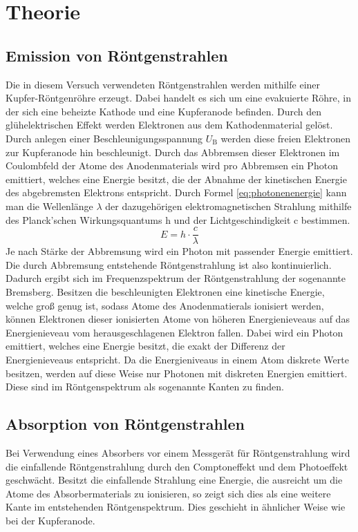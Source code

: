 
\section{Theorie}
%
\subsection{Emission von Röntgenstrahlen}
%
Die in diesem Versuch verwendeten Röntgenstrahlen werden mithilfe einer Kupfer-Röntgenröhre erzeugt. Dabei handelt es sich um eine evakuierte Röhre, in der sich eine beheizte Kathode und eine Kupferanode befinden. Durch den glühelektrischen Effekt werden Elektronen aus dem Kathodenmaterial gelöst. Durch anlegen einer Beschleunigungsspannung $U_\text{B}$ werden diese freien Elektronen zur Kupferanode hin beschleunigt. Durch das Abbremsen dieser Elektronen im Coulombfeld der Atome des Anodenmaterials wird pro Abbremsen ein Photon emittiert, welches eine Energie besitzt, die der Abnahme der kinetischen Energie des abgebremsten Elektrons entspricht. Durch Formel \eqref{eq:photonenenergie} kann man die Wellenlänge $\lambda$ der dazugehörigen elektromagnetischen Strahlung mithilfe des Planck'schen Wirkungsquantums h und der Lichtgeschindigkeit c bestimmen.
%
\begin{equation}
E = h \cdot \frac{c}{\lambda}
\label{eq:photonenenergie}
\end{equation}
%
Je nach Stärke der Abbremsung wird ein Photon mit passender Energie emittiert. Die durch Abbremsung entstehende Röntgenstrahlung ist also kontinuierlich. Dadurch ergibt sich im Frequenzspektrum der Röntgenstrahlung der sogenannte Bremsberg. Besitzen die beschleunigten Elektronen eine kinetische Energie, welche groß genug ist, sodass Atome des Anodenmatierals ionisiert werden, können Elektronen dieser ionisierten Atome von höheren Energienieveaus auf das Energienieveau vom herausgeschlagenen Elektron fallen. Dabei wird ein Photon emittiert, welches eine Energie besitzt, die exakt der Differenz der Energienieveaus entspricht. Da die Energieniveaus in einem Atom diskrete Werte besitzen, werden auf diese Weise nur Photonen mit diskreten Energien emittiert. Diese sind im Röntgenspektrum als sogenannte Kanten zu finden.


%
\subsection{Absorption von Röntgenstrahlen}
%
Bei Verwendung eines Absorbers vor einem Messgerät für Röntgenstrahlung wird die einfallende Röntgenstrahlung durch den Comptoneffekt und dem Photoeffekt geschwächt. Besitzt die einfallende Strahlung eine Energie, die ausreicht um die Atome des Absorbermaterials zu ionisieren, so zeigt sich dies als eine weitere Kante im entstehenden Röntgenspektrum. Dies geschieht in ähnlicher Weise wie bei der Kupferanode.

